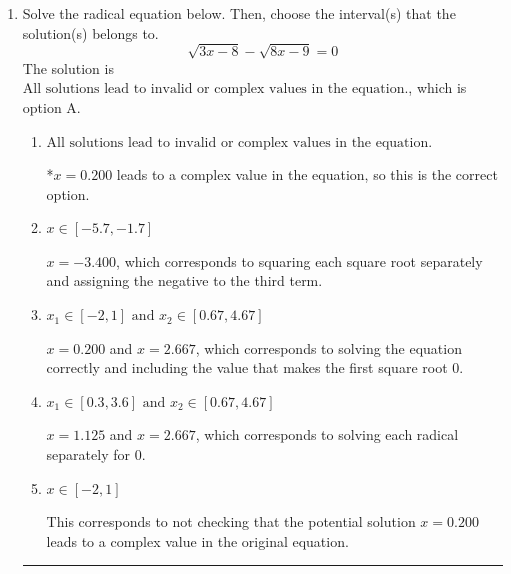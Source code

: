 \documentclass{extbook}[14pt]
\newcommand{\litem}[1]{\item #1

\rule{\textwidth}{0.4pt}}
\begin{document}
\begin{enumerate}\litem{
Solve the radical equation below. Then, choose the interval(s) that the solution(s) belongs to.
\[ \sqrt{3 x - 8} - \sqrt{8 x - 9} = 0 \]The solution is \( \text{All solutions lead to invalid or complex values in the equation.} \), which is option A.\begin{enumerate}[label=\Alph*.]
\item \( \text{All solutions lead to invalid or complex values in the equation.} \)

*$x = 0.200$ leads to a complex value in the equation, so this is the correct option.
\item \( x \in [-5.7,-1.7] \)

$x = -3.400$, which corresponds to squaring each square root separately and assigning the negative to the third term.
\item \( x_1 \in [-2, 1] \text{ and } x_2 \in [0.67,4.67] \)

$x = 0.200$ and $x = 2.667$, which corresponds to solving the equation correctly and including the value that makes the first square root 0.
\item \( x_1 \in [0.3, 3.6] \text{ and } x_2 \in [0.67,4.67] \)

$x = 1.125$ and $x = 2.667$, which corresponds to solving each radical separately for 0.
\item \( x \in [-2,1] \)

This corresponds to not checking that the potential solution $x = 0.200$ leads to a complex value in the original equation.
\end{enumerate}

}
\end{enumerate}
\end{document}
